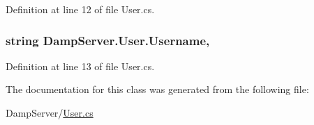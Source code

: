 Definition at line 12 of file User.\-cs.

\hypertarget{class_damp_server_1_1_user_a17c86d74ac30a323864050485b01db83}{
\subsubsection[{Username}]{\setlength{\rightskip}{0pt plus 5cm}string Damp\-Server.\-User.\-Username\hspace{0.3cm}{\ttfamily [get]}, {\ttfamily [set]}}}\label{class_damp_server_1_1_user_a17c86d74ac30a323864050485b01db83}


Definition at line 13 of file User.\-cs.



The documentation for this class was generated from the following file\-:\begin{DoxyCompactItemize}
\item 
Damp\-Server/\hyperlink{_user_8cs}{User.\-cs}\end{DoxyCompactItemize}
